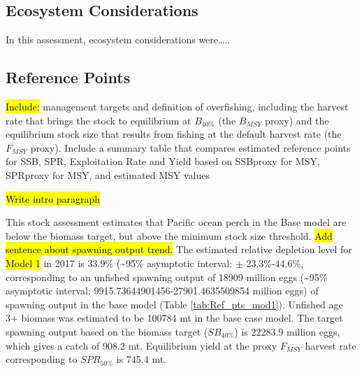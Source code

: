 \documentclass[12pt,]{article}
\begin{document}
\FloatBarrier

\subsection*{Ecosystem Considerations}\label{ecosystem-considerations}

In this assessment, ecosystem considerations were\ldots{}..

\subsection*{Reference Points}\label{reference-points}

\hl{Include:} management targets and definition of overfishing,
including the harvest rate that brings the stock to equilibrium at
\(B_{40\%}\) (the \(B_{MSY}\) proxy) and the equilibrium stock size that
results from fishing at the default harvest rate (the \(F_{MSY}\)
proxy). Include a summary table that compares estimated reference points
for SSB, SPR, Exploitation Rate and Yield based on SSBproxy for MSY,
SPRproxy for MSY, and estimated MSY values

\hl{Write intro paragraph}

This stock assessment estimates that Pacific ocean perch in the Base
model are below the biomass target, but above the minimum stock size
threshold. \hl{Add sentence about spawning output trend.} The estimated
relative depletion level for \hl{Model 1} in 2017 is 33.9\%
(\textasciitilde{}95\% asymptotic interval: \(\pm\) 23.3\%-44.6\%,
corresponding to an unfished spawning output of 18909 million eggs
(\textasciitilde{}95\% asymptotic interval:
9915.73644901456-27901.4635509854 million eggs) of spawning output in
the base model (Table \ref{tab:Ref_pts_mod1}). Unfished age 3+ biomass
was estimated to be 100784 mt in the base case model. The target
spawning output based on the biomass target (\(SB_{40\%}\)) is 22283.9
million eggs, which gives a catch of 908.2 mt. Equilibrium yield at the
proxy \(F_{MSY}\) harvest rate corresponding to \(SPR_{50\%}\) is 745.4
mt.

\FloatBarrier
\end{document}
